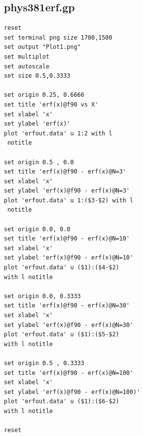 \documentclass[twocolumn]{article}
\begin{document}
\subsection{phys381erf.gp}\label{[phys381erf.gp]}
\begin{verbatim}
reset
set terminal png size 1700,1500
set output "Plot1.png"
set multiplot 
set autoscale
set size 0.5,0.3333

set origin 0.25, 0.6666
set title 'erf(x)@f90 vs X'
set xlabel 'x'
set ylabel 'erf(x)'
plot 'erfout.data' u 1:2 with l
 notitle

set origin 0.5 , 0.0
set title 'erf(x)@f90 - erf(x)@N=3'
set xlabel 'x'
set ylabel 'erf(x)@f90 - erf(x)@N=3'
plot 'erfout.data' u 1:($3-$2) with l
 notitle

set origin 0.0, 0.0
set title 'erf(x)@f90 - erf(x)@N=10'
set xlabel 'x'
set ylabel 'erf(x)@f90 - erf(x)@N=10'
plot 'erfout.data' u ($1):($4-$2) 
with l notitle

set origin 0.0, 0.3333
set title 'erf(x)@f90 - erf(x)@N=30'
set xlabel 'x'
set ylabel 'erf(x)@f90 - erf(x)@N=30'
plot 'erfout.data' u ($1):($5-$2) 
with l notitle

set origin 0.5 , 0.3333
set title 'erf(x)@f90 - erf(x)@N=100'
set xlabel 'x'
set ylabel 'erf(x)@f90 - erf(x)@N=100)'
plot 'erfout.data' u ($1):($6-$2) 
with l notitle

reset
\end{verbatim}
\end{document}
